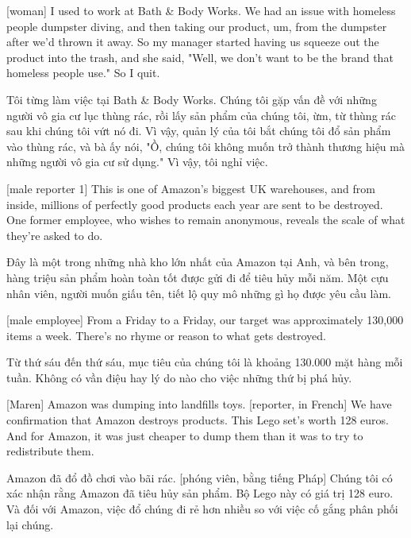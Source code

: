 \documentclass[a4paper]{article}
\begin{document}
	[woman] I used to work at Bath \& Body Works.
	We had an issue with homeless people dumpster diving, and then taking our product, um, from the dumpster after we'd thrown it away.
	So my manager started having us squeeze out the product into the trash, and she said, "Well, we don't want to be the brand that homeless people use."
	So I quit.
	
	\begin{vietnamese-v2}
		[phụ nữ] Tôi từng làm việc tại Bath \& Body Works.
		Chúng tôi gặp vấn đề với những người vô gia cư lục thùng rác, rồi lấy sản phẩm của chúng tôi, ừm, từ thùng rác sau khi chúng tôi vứt nó đi.
		Vì vậy, quản lý của tôi bắt chúng tôi đổ sản phẩm vào thùng rác, và bà ấy nói, "Ồ, chúng tôi không muốn trở thành thương hiệu mà những người vô gia cư sử dụng."
		Vì vậy, tôi nghỉ việc.
	\end{vietnamese-v2}
	
	[male reporter 1] This is one of Amazon's biggest UK warehouses, and from inside, millions of perfectly good products each year are sent to be destroyed. One former employee, who wishes to remain anonymous, reveals the scale of what they're asked to do.
	
	\begin{vietnamese-v2}
		 Đây là một trong những nhà kho lớn nhất của Amazon tại Anh, và bên trong, hàng triệu sản phẩm hoàn toàn tốt được gửi đi để tiêu hủy mỗi năm. Một cựu nhân viên, người muốn giấu tên, tiết lộ quy mô những gì họ được yêu cầu làm.
	\end{vietnamese-v2}
	
	[male employee] From a Friday to a Friday, our target was approximately 130,000 items a week.
	There's no rhyme or reason to what gets destroyed.
	
	\begin{vietnamese-v2}
		 Từ thứ sáu đến thứ sáu, mục tiêu của chúng tôi là khoảng 130.000 mặt hàng mỗi tuần.
		Không có vần điệu hay lý do nào cho việc những thứ bị phá hủy.
	\end{vietnamese-v2}
	
	[Maren] Amazon was dumping into landfills toys.
	[reporter, in French] We have confirmation that Amazon destroys products.
	This Lego set's worth 128 euros.
	And for Amazon, it was just cheaper to dump them than it was to try to redistribute them.
	
	\begin{vietnamese-v2}
		[Maren] Amazon đã đổ đồ chơi vào bãi rác.
		[phóng viên, bằng tiếng Pháp] Chúng tôi có xác nhận rằng Amazon đã tiêu hủy sản phẩm.
		Bộ Lego này có giá trị 128 euro.
		Và đối với Amazon, việc đổ chúng đi rẻ hơn nhiều so với việc cố gắng phân phối lại chúng.
	\end{vietnamese-v2}
	
\end{document}
